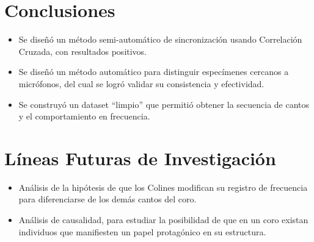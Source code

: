 \documentclass[a0,portrait]{a0poster}
\begin{document}
\begin{multicols}{3}
\color{SaddleBrown} %

\section*{Conclusiones}

\begin{itemize}
\item Se diseñó un método semi-automático de sincronización \space \space \space \space \space usando Correlación Cruzada, con resultados positivos.
\item Se diseñó un método automático para distinguir especímenes cercanos a micrófonos, del cual se logró validar su consistencia y efectividad.
\item Se construyó un dataset “limpio” que permitió obtener la secuencia de cantos y el comportamiento en frecuencia.
\end{itemize}

\color{DarkSlateGray} %


\section*{Líneas Futuras de Investigación}

\begin{itemize}
    \item Análisis de la hipótesis de que los Colines modifican su registro de frecuencia para diferenciarse de los demás cantos del coro.
    \item Análisis de causalidad, para estudiar la posibilidad de que en un coro existan individuos que manifiesten un papel protagónico en su estructura.
\end{itemize}

\renewcommand{\refname}{Referencias} %
\nocite{*} %


\end{multicols}
\end{document}
